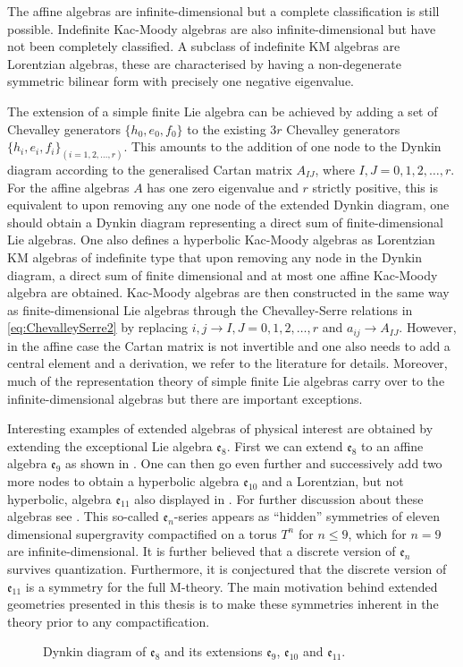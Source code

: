 The affine algebras are infinite-dimensional but a complete classification is still possible. Indefinite Kac-Moody algebras are also infinite-dimensional but have not been completely classified. A subclass of indefinite KM algebras are Lorentzian algebras, these are characterised by having a non-degenerate symmetric bilinear form with precisely one negative eigenvalue. 

The extension of a simple finite Lie algebra can be achieved by adding a set of Chevalley generators $\{h_0,e_0,f_0\}$ to the existing $3r$ Chevalley generators $\{h_i,e_i,f_i\}_{(i=1,2,\ldots,r)}$. This amounts to the addition of one node to the Dynkin diagram according to the generalised Cartan matrix $A_{IJ}$, where $I,J=0,1,2,\ldots, r$. For the affine algebras $A$ has one zero eigenvalue and $r$ strictly positive, this is equivalent to upon removing any one node of the extended Dynkin diagram, one should obtain a Dynkin diagram representing a direct sum of finite-dimensional Lie algebras. One also defines a hyperbolic Kac-Moody algebras as Lorentzian KM algebras of indefinite type that upon removing any node in the Dynkin diagram, a direct sum of finite dimensional and at most one affine Kac-Moody algebra are obtained. Kac-Moody algebras are then constructed in the same way as finite-dimensional Lie algebras through the Chevalley-Serre relations in \eqref{eq:ChevalleySerre2} by replacing $i,j\to I,J=0,1,2,\ldots,r$ and $a_{ij}\to A_{IJ}$. However, in the affine case the Cartan matrix is not invertible and one also needs to add a central element and a derivation, we refer to the literature for details. Moreover, much of the representation theory of simple finite Lie algebras carry over to the infinite-dimensional algebras but there are important exceptions. 

Interesting examples of extended algebras of physical interest are obtained by extending the exceptional Lie algebra $\mathfrak{e}_8$. First we can extend $\mathfrak{e}_8$ to an affine algebra $\mathfrak{e}_9$ as shown in . One can then go even further and successively add two more nodes to obtain a hyperbolic algebra $\mathfrak{e}_{10}$ and a Lorentzian, but not hyperbolic, algebra $\mathfrak{e}_{11}$ also displayed in . For further discussion about these algebras see \cite{PhdJakob2009,PhdDaniel2010}. This so-called $\mathfrak{e}_n$-series appears as ``hidden'' symmetries of eleven dimensional supergravity compactified on a torus $T^n$ for $n\leq 9$, which for $n=9$ are infinite-dimensional. It is further believed that a discrete version of $\mathfrak{e}_n$ survives quantization. Furthermore, it is conjectured \cite{West2011} that the discrete version of $\mathfrak{e}_{11}$ is a symmetry for the full M-theory. The main motivation behind extended geometries presented in this thesis is to make these symmetries inherent in the theory prior to any compactification. 
\begin{figure}
    \caption{Dynkin diagram of $\mathfrak{e}_8$ and its extensions $\mathfrak{e}_9$, $\mathfrak{e}_{10}$ and $\mathfrak{e}_{11}$.}
    \label{fig:DynkinEseries}
\end{figure}

